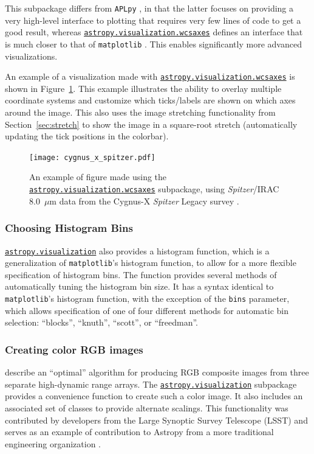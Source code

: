 \documentclass[modern]{aastex62}
\newcommand{\package}[1]{\texttt{#1}\xspace}
\newcommand{\astropy}{Astropy\xspace}
\newcommand{\sectionname}{Section\xspace}
\renewcommand{\figurename}{Figure\xspace}
\newcommand{\astropysubpkg}[1]{\href{http://docs.astropy.org/en/stable/#1/index.html}{\texttt{astropy.#1}}\xspace}
\newcommand{\astropywcsaxes}{\href{http://docs.astropy.org/en/stable/visualization/wcsaxes/index.html}{\texttt{astropy.visualization.wcsaxes}}\xspace}
\begin{document}
This subpackage differs from \package{APLpy} \citep{aplpy}, in that the latter
focuses on providing a very high-level interface to plotting that requires very
few lines of code to get a good result, whereas \astropywcsaxes defines an
interface that is much closer to that of \package{matplotlib} \citep{matplotlib}.
This enables significantly more advanced visualizations.

An example of a visualization made with \astropywcsaxes is shown in
\figurename~\ref{fig:wcsaxes}. This example illustrates the ability to
overlay multiple coordinate systems and customize which ticks/labels are shown
on which axes around the image. This also uses the image stretching
functionality from \sectionname~\ref{sec:stretch} to show the image in a
square-root stretch (automatically updating the tick positions in the colorbar).

\begin{figure}
\texttt{[image: cygnus\_x\_spitzer.pdf]}
\caption{%
An example of figure made using the \astropywcsaxes
subpackage, using \textit{Spitzer}/IRAC 8.0~$\mu$m data from the Cygnus-X
\textit{Spitzer} Legacy survey \citep{cygnusx}.
\label{fig:wcsaxes}
}
\end{figure}

\subsubsection{Choosing Histogram Bins}

\astropysubpkg{visualization} also provides a histogram function, which is a
generalization of \texttt{matplotlib}’s histogram function, to allow for a more
flexible specification of histogram bins.  The function provides several methods
of automatically tuning the histogram bin size. It has a syntax identical to
\texttt{matplotlib}’s histogram function, with the exception of the \texttt{bins}
parameter, which allows specification of one of four different methods for
automatic bin selection: ``blocks'', ``knuth'', ``scott'', or ``freedman''.

\subsubsection{Creating color RGB images}

\cite{Lupton2004} describe an ``optimal'' algorithm for producing
RGB composite images from three separate high-dynamic range
arrays. The \astropysubpkg{visualization} subpackage provides a convenience
function to create such a color image.  It also includes an associated set of
classes to provide alternate scalings.
This functionality was contributed by developers from the Large Synoptic Survey
Telescope (LSST) and serves as an example of contribution to \astropy from a
more traditional engineering organization \citep{Jennes2016}.
\end{document}
